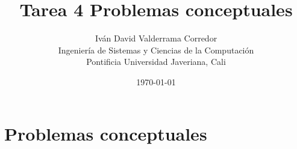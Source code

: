 \documentclass[a4paper,12pt]{article}
\title{Tarea 4 Problemas conceptuales}
\author{%
  Iván David Valderrama Corredor\\ %
  Ingeniería de Sistemas y Ciencias de la Computación\\ %
  Pontificia Universidad Javeriana, Cali}
\date{\today}
\newcommand{\subfigureautorefname}{\figureautorefname}
\begin{document}
	
\renewcommand{\tablename}{\bfseries Tabla} %
\renewcommand{\figurename}{\bfseries Figura} %
%
\maketitle

\tableofcontents

\newpage


\section{Problemas conceptuales}
\end{document}

